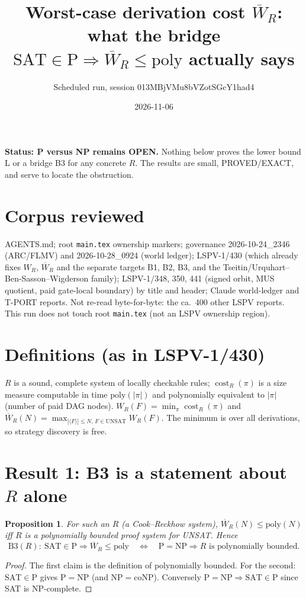 \documentclass{article}
\title{Worst-case derivation cost $\overline W_R$: what the bridge $\mathrm{SAT}\in\mathrm P\Rightarrow\overline W_R\le\mathrm{poly}$ actually says}
\author{Scheduled run, session 013MBjVMu8bVZotSGcY1had4}
\date{2026-11-06}
\newtheorem{prop}{Proposition}
\begin{document}
\maketitle
\noindent\textbf{Status: P versus NP remains OPEN.} Nothing below proves the lower bound L or a bridge B3 for any concrete $R$. The results are small, PROVED/EXACT, and serve to locate the obstruction.

\section*{Corpus reviewed}
AGENTS.md; root \texttt{main.tex} ownership markers; governance 2026-10-24\_2346 (ARC/FLMV) and 2026-10-28\_0924 (world ledger); LSPV-1/430 (which already fixes $W_R$, $\overline W_R$ and the separate targets B1, B2, B3, and the Tseitin/Urquhart--Ben-Sasson--Wigderson family); LSPV-1/348, 350, 441 (signed orbit, MUS quotient, paid gate-local boundary) by title and header; Claude world-ledger and T-PORT reports. Not re-read byte-for-byte: the ca.\ 400 other LSPV reports. This run does not touch root \texttt{main.tex} (not an LSPV ownership region).

\section*{Definitions (as in LSPV-1/430)}
$R$ is a sound, complete system of locally checkable rules; $\operatorname{cost}_R(\pi)$ is a size measure computable in time $\mathrm{poly}(|\pi|)$ and polynomially equivalent to $|\pi|$ (number of paid DAG nodes). $W_R(F)=\min_\pi \operatorname{cost}_R(\pi)$ and $\overline W_R(N)=\max_{|\langle F\rangle|\le N,\,F\in\mathrm{UNSAT}}W_R(F)$. The minimum is over all derivations, so strategy discovery is free.

\section*{Result 1: B3 is a statement about $R$ alone}
\begin{prop}\label{p1}
For such an $R$ (a Cook--Reckhow system), $\overline W_R(N)\le \mathrm{poly}(N)$ iff $R$ is a polynomially bounded proof system for UNSAT. Hence
\[
\mathrm{B3}(R):\ \mathrm{SAT}\in\mathrm P\Rightarrow\overline W_R\le\mathrm{poly}
\quad\Longleftrightarrow\quad
\mathrm P=\mathrm{NP}\Rightarrow R\text{ is polynomially bounded}.
\]
\end{prop}
\begin{proof}
The first claim is the definition of polynomially bounded. For the second: $\mathrm{SAT}\in\mathrm P$ gives $\mathrm P=\mathrm{NP}$ (and $\mathrm{NP}=\mathrm{coNP}$). Conversely $\mathrm P=\mathrm{NP}\Rightarrow\mathrm{SAT}\in\mathrm P$ since SAT is NP-complete. \qedhere
\end{proof}
\end{document}
